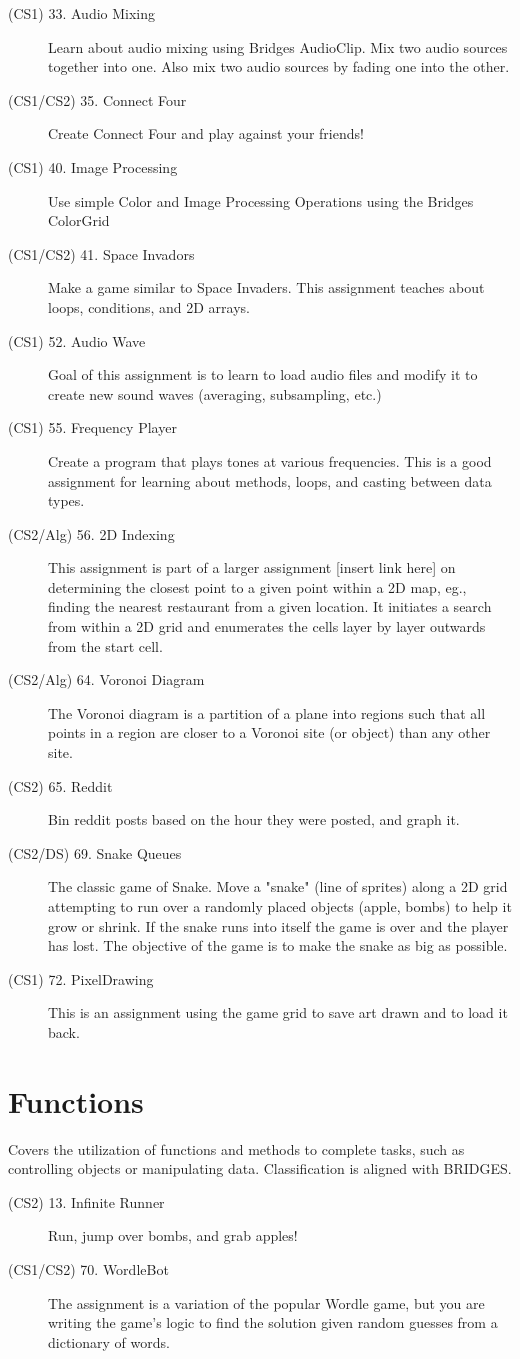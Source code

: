 \documentclass[10pt, onecoulmn]{article}
\begin{document}
\begin{description}
	\item[(CS1) 33. Audio Mixing] Learn about audio mixing using Bridges AudioClip. Mix two audio sources together into one. Also mix two audio sources by fading one into the other.
	\item[(CS1/CS2) 35. Connect Four] Create Connect Four and play against your friends!
	\item[(CS1) 40. Image Processing] Use simple Color and Image Processing Operations using the Bridges ColorGrid
	\item[(CS1/CS2) 41. Space Invadors] Make a game similar to Space Invaders. This assignment teaches about loops, conditions, and 2D arrays.
	\item[(CS1) 52. Audio Wave] Goal of this assignment is to learn to load audio files and modify it to create new sound waves (averaging, subsampling, etc.)
	\item[(CS1) 55. Frequency Player] Create a program that plays tones at various frequencies. This is a good assignment for learning about methods, loops, and casting between data types.
	\item[(CS2/Alg) 56. 2D Indexing] This assignment is part of a larger assignment [insert link here] on determining the closest point to a given point within a 2D map, eg., finding the nearest restaurant from a given location. It initiates a search from within a 2D grid and enumerates the cells layer by layer outwards from the start cell.
	\item[(CS2/Alg) 64. Voronoi Diagram] The Voronoi diagram is a partition of a plane into regions such that all points in a region are closer to a Voronoi site (or object) than any other site.
	\item[(CS2) 65. Reddit] Bin reddit posts based on the hour they were posted, and graph it.
	\item[(CS2/DS) 69. Snake Queues] The classic game of Snake. Move a "snake" (line of sprites) along a 2D grid attempting to run over a randomly placed objects (apple, bombs) to help it grow or shrink. If the snake runs into itself the game is over and the player has lost. The objective of the game is to make the snake as big as possible.
	\item[(CS1) 72. PixelDrawing] This is an assignment using the game grid to save art drawn and to load it back.
\end{description}
\section{Functions}
Covers the utilization of functions and methods to complete tasks, such as controlling objects or manipulating data. Classification is aligned with BRIDGES.
\begin{description}
	\item[(CS2) 13. Infinite Runner] Run, jump over bombs, and grab apples!
	\item[(CS1/CS2) 70. WordleBot] The assignment is a variation of the popular Wordle game, but you are writing the game's logic to find the solution given random guesses from a dictionary of words.
\end{description}
\end{document}
